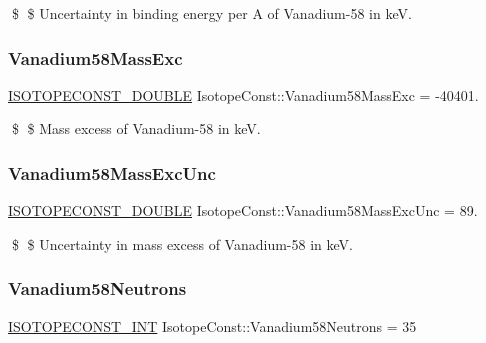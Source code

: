 \$ \$ Uncertainty in binding energy per A of Vanadium-\/58 in keV. \mbox{\label{group___isotope_const-_vanadium-_v58_ga4f525e1608beda5159d9d7eadc62f8fb}} 
\subsubsection{\texorpdfstring{Vanadium58\+Mass\+Exc}{Vanadium58MassExc}}
{\footnotesize\ttfamily \mbox{\hyperlink{group___isotope_const-_macros_ga8f45a7272ce02c0b4c65c44636ed719a}{I\+S\+O\+T\+O\+P\+E\+C\+O\+N\+S\+T\+\_\+\+D\+O\+U\+B\+LE}} Isotope\+Const\+::\+Vanadium58\+Mass\+Exc = -\/40401.}

\$ \$ Mass excess of Vanadium-\/58 in keV. \mbox{\label{group___isotope_const-_vanadium-_v58_ga512f4422fd84092bb99bcbb271d6c25e}} 
\subsubsection{\texorpdfstring{Vanadium58\+Mass\+Exc\+Unc}{Vanadium58MassExcUnc}}
{\footnotesize\ttfamily \mbox{\hyperlink{group___isotope_const-_macros_ga8f45a7272ce02c0b4c65c44636ed719a}{I\+S\+O\+T\+O\+P\+E\+C\+O\+N\+S\+T\+\_\+\+D\+O\+U\+B\+LE}} Isotope\+Const\+::\+Vanadium58\+Mass\+Exc\+Unc = 89.}

\$ \$ Uncertainty in mass excess of Vanadium-\/58 in keV. \mbox{\label{group___isotope_const-_vanadium-_v58_gaabb58e3deb7845b606c3a8d856bfe3ab}} 
\subsubsection{\texorpdfstring{Vanadium58\+Neutrons}{Vanadium58Neutrons}}
{\footnotesize\ttfamily \mbox{\hyperlink{group___isotope_const-_macros_ga5f18360b3e99483a35c32d789e62621c}{I\+S\+O\+T\+O\+P\+E\+C\+O\+N\+S\+T\+\_\+\+I\+NT}} Isotope\+Const\+::\+Vanadium58\+Neutrons = 35}

